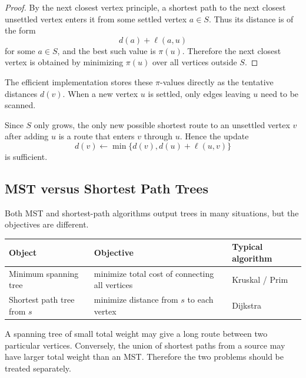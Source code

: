 \begin{proof}
By the next closest vertex principle, a shortest path to the next closest unsettled vertex enters it from some settled vertex \(a\in S\). Thus its distance is of the form
\[
d(a)+\ell(a,u)
\]
for some \(a\in S\), and the best such value is \(\pi(u)\). Therefore the next closest vertex is obtained by minimizing \(\pi(u)\) over all vertices outside \(S\).
\end{proof}

The efficient implementation stores these \(\pi\)-values directly as the tentative distances \(d(v)\). When a new vertex \(u\) is settled, only edges leaving \(u\) need to be scanned.

\begin{examtip}[title={Why the optimized update is enough}]
Since \(S\) only grows, the only new possible shortest route to an unsettled vertex \(v\) after adding \(u\) is a route that enters \(v\) through \(u\). Hence the update
\[
d(v)\leftarrow \min\{d(v),d(u)+\ell(u,v)\}
\]
is sufficient.
\end{examtip}

\subsection{MST versus Shortest Path Trees}

Both MST and shortest-path algorithms output trees in many situations, but the objectives are different.

\begin{center}
\small
\begin{tabular}{@{}p{}p{}p{}@{}}
\toprule
\textbf{Object} & \textbf{Objective} & \textbf{Typical algorithm} \\
\midrule
Minimum spanning tree & minimize total cost of connecting all vertices & Kruskal / Prim \\
Shortest path tree from \(s\) & minimize distance from \(s\) to each vertex & Dijkstra \\
\bottomrule
\end{tabular}
\end{center}

\begin{examplebox}[title={Different objectives can give different trees}]
A spanning tree of small total weight may give a long route between two particular vertices. Conversely, the union of shortest paths from a source may have larger total weight than an MST. Therefore the two problems should be treated separately.
\end{examplebox}

